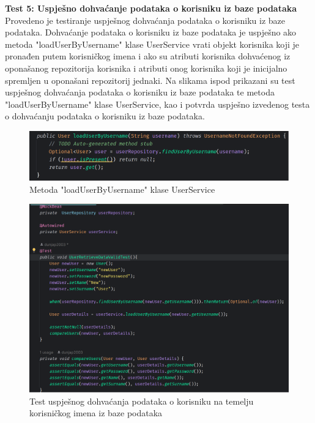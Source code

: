 \textbf{Test 5: Uspješno dohvaćanje podataka o korisniku iz baze podataka} \\

Provedeno je testiranje uspješnog dohvaćanja podataka o korisniku iz baze podataka. Dohvaćanje podataka o korisniku iz baze podataka je uspješno ako metoda "loadUserByUsername" klase UserService vrati objekt korisnika koji je pronađen putem korisničkog imena i ako su atributi korisnika dohvaćenog iz oponašanog repozitorija korisnika i atributi onog korisnika koji je inicijalno spremljen u oponašani repozitorij jednaki. Na slikama ispod prikazani su test uspješnog dohvaćanja podataka o korisniku iz baze podataka te metoda "loadUserByUsername" klase UserService, kao i potvrda uspješno izvedenog testa o dohvaćanju podataka o korisniku iz baze podataka.

				\begin{figure}[H]
			\includegraphics[scale=0.4]{slike/loadUserByUsername.PNG} %
			\centering
			\caption{Metoda "loadUserByUsername" klase UserService}
			\label{Metoda "loadUserByUsername" klase UserService}
		\end{figure}
		
						\begin{figure}[H]
			\includegraphics[scale=0.4]{slike/userRetrieveDataValidTest.PNG} %
			\centering
			\caption{Test uspješnog dohvaćanja podataka o korisniku na temelju korisničkog imena iz baze podataka}
			\label{Test uspješnog dohvaćanja podataka o korisniku na temelju korisničkog imena iz baze podataka}
		\end{figure}
		
